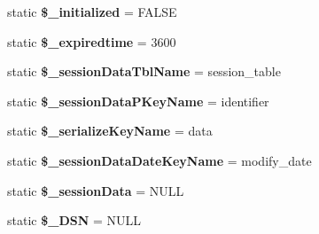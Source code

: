 \begin{DoxyCompactItemize}
\item 
\hypertarget{class_session_data_memcache_a2e3e68055a5bb996b545c07cc7a3fa68}{}static {\bfseries \$\+\_\+initialized} = F\+A\+L\+S\+E\label{class_session_data_memcache_a2e3e68055a5bb996b545c07cc7a3fa68}

\item 
\hypertarget{class_session_data_memcache_abddda812f41089fbfb5f9d53414ffe8f}{}static {\bfseries \$\+\_\+expiredtime} = 3600\label{class_session_data_memcache_abddda812f41089fbfb5f9d53414ffe8f}

\item 
\hypertarget{class_session_data_memcache_a7b0cd680ea173915e29e35c4680b4235}{}static {\bfseries \$\+\_\+session\+Data\+Tbl\+Name} = \textquotesingle{}session\+\_\+table\textquotesingle{}\label{class_session_data_memcache_a7b0cd680ea173915e29e35c4680b4235}

\item 
\hypertarget{class_session_data_memcache_a2da0ed1e581f4765b21972d32e58bbe8}{}static {\bfseries \$\+\_\+session\+Data\+P\+Key\+Name} = \textquotesingle{}identifier\textquotesingle{}\label{class_session_data_memcache_a2da0ed1e581f4765b21972d32e58bbe8}

\item 
\hypertarget{class_session_data_memcache_a35d1534fc9568511f88982be2d88ea82}{}static {\bfseries \$\+\_\+serialize\+Key\+Name} = \textquotesingle{}data\textquotesingle{}\label{class_session_data_memcache_a35d1534fc9568511f88982be2d88ea82}

\item 
\hypertarget{class_session_data_memcache_a73f8598f2c048580eb60d44acc7218ba}{}static {\bfseries \$\+\_\+session\+Data\+Date\+Key\+Name} = \textquotesingle{}modify\+\_\+date\textquotesingle{}\label{class_session_data_memcache_a73f8598f2c048580eb60d44acc7218ba}

\item 
\hypertarget{class_session_data_memcache_a79e29d0127e55d3b140bf0aa70ea78a9}{}static {\bfseries \$\+\_\+session\+Data} = N\+U\+L\+L\label{class_session_data_memcache_a79e29d0127e55d3b140bf0aa70ea78a9}

\item 
\hypertarget{class_session_data_memcache_a51d7024dcc926acfaaab0d818b7e1750}{}static {\bfseries \$\+\_\+\+D\+S\+N} = N\+U\+L\+L\label{class_session_data_memcache_a51d7024dcc926acfaaab0d818b7e1750}

\end{DoxyCompactItemize}


